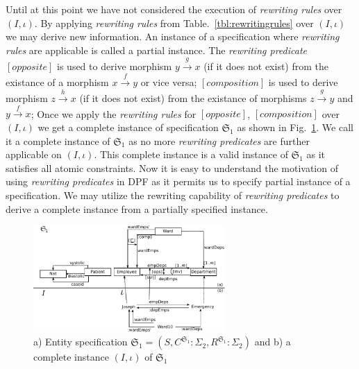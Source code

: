 \documentclass{eceasst}
\begin{document}
 
Until at this point we have not considered the execution of \textit{rewriting rules} over $(I, \iota)$. 
By applying \textit{rewriting rules} from Table.~\ref{tbl:rewritingrules} over $(I, \iota)$ we may derive new information. 
An instance of a specification where \textit{rewriting rules} are applicable is called a partial instance. 
The \textit{rewriting predicate} $[opposite]$ is used to derive morphism $y \xrightarrow{g} x$ (if it does not exist) from the existance of a morphism $x \xrightarrow{f} y$ or vice versa; 
$[composition]$ is used to derive morphism $z \xrightarrow{h} x$ (if it does not exist) from the existance of morphisms $z \xrightarrow{g} y$ and $y \xrightarrow{f} x$; 
Once we apply the \textit{rewriting rules} for $[opposite]$, $[composition]$ over $(I, \iota)$ we get a complete instance of specification $\mathfrak{S}_1$ as shown in 
Fig.~\ref{fig:entity-1-full}. We call it a complete instance of $\mathfrak{S}_1$ as no more \textit{rewriting predicates} are further applicable on $(I, \iota)$. 
This complete instance is a valid instance of $\mathfrak{S}_1$ as it satisfies all atomic constraints. 
Now it is easy to understand the motivation of using \textit{rewriting predicates} in DPF as it permits us to specify partial instance of a specification. 
We may utilize the rewriting capability of \textit{rewriting predicates} to derive a complete instance from a partially specified instance. 



\begin{figure}[h]
\centering
 \includegraphics[width=0.65\textwidth]{entity-1-full.pdf}
 \caption{ a) Entity specification $\mathfrak{S}_1 = (S, C^{\mathfrak{S}_1} : \Sigma_2,  R^{\mathfrak{S}_1} : \Sigma_2)$ and  b) a complete instance $(I, \iota)$ of $\mathfrak{S}_1$}
 \label{fig:entity-1-full}
 \end{figure}
\end{document}
